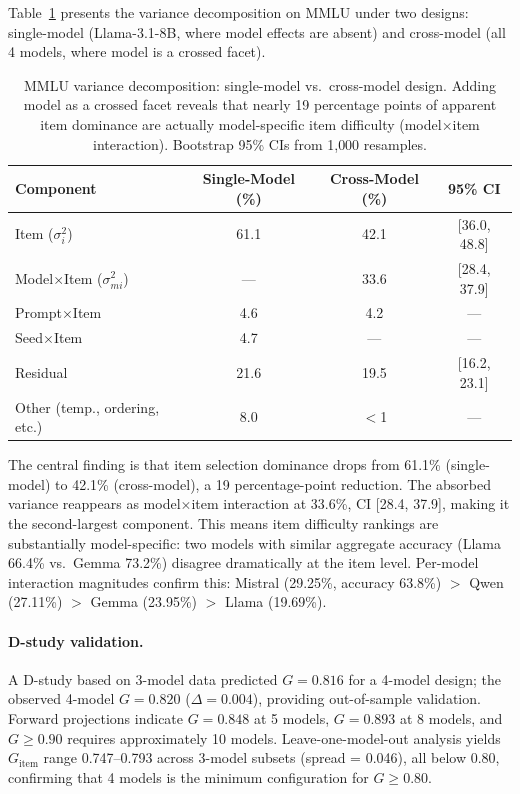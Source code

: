 \documentclass[11pt]{article}
\begin{document}
Table~\ref{tab:mmlu_decomposition} presents the variance decomposition on MMLU under two designs: single-model (Llama-3.1-8B, where model effects are absent) and cross-model (all 4 models, where model is a crossed facet).

\begin{table}[t]
\centering
\caption{MMLU variance decomposition: single-model vs.\ cross-model design. Adding model as a crossed facet reveals that nearly 19 percentage points of apparent item dominance are actually model-specific item difficulty (model$\times$item interaction). Bootstrap 95\% CIs from 1{,}000 resamples.}
\label{tab:mmlu_decomposition}
\small
\begin{tabular}{lccc}
\toprule
\textbf{Component} & \textbf{Single-Model (\%)} & \textbf{Cross-Model (\%)} & \textbf{95\% CI} \\
\midrule
Item ($\sigma^2_i$)               & 61.1 & 42.1 & [36.0, 48.8] \\
Model$\times$Item ($\sigma^2_{mi}$) & ---  & 33.6 & [28.4, 37.9] \\
Prompt$\times$Item                 & 4.6  & 4.2  & --- \\
Seed$\times$Item                   & 4.7  & ---  & --- \\
Residual                           & 21.6 & 19.5 & [16.2, 23.1] \\
Other (temp., ordering, etc.)      & 8.0  & $<$1 & --- \\
\bottomrule
\end{tabular}
\end{table}

The central finding is that item selection dominance drops from 61.1\% (single-model) to 42.1\% (cross-model), a 19 percentage-point reduction.
The absorbed variance reappears as model$\times$item interaction at 33.6\%, CI [28.4, 37.9], making it the second-largest component.
This means item difficulty rankings are substantially model-specific: two models with similar aggregate accuracy (Llama 66.4\% vs.\ Gemma 73.2\%) disagree dramatically at the item level.
Per-model interaction magnitudes confirm this: Mistral (29.25\%, accuracy 63.8\%) $>$ Qwen (27.11\%) $>$ Gemma (23.95\%) $>$ Llama (19.69\%).

\paragraph{D-study validation.}
A D-study based on 3-model data predicted $G = 0.816$ for a 4-model design; the observed 4-model $G = 0.820$ ($\Delta = 0.004$), providing out-of-sample validation.
Forward projections indicate $G = 0.848$ at 5 models, $G = 0.893$ at 8 models, and $G \geq 0.90$ requires approximately 10 models.
Leave-one-model-out analysis yields $G_{\text{item}}$ range 0.747--0.793 across 3-model subsets (spread = 0.046), all below 0.80, confirming that 4 models is the minimum configuration for $G \geq 0.80$.
\end{document}
